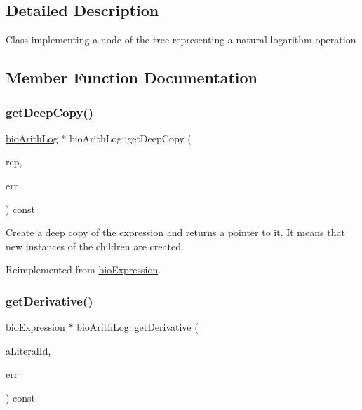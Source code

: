 \subsection{Detailed Description}
Class implementing a node of the tree representing a natural logarithm operation 

\subsection{Member Function Documentation}
\mbox{\label{classbio_arith_log_a1717f06ff8d70f5285272ee66c669174}} 
\subsubsection{\texorpdfstring{get\+Deep\+Copy()}{getDeepCopy()}}
{\footnotesize\ttfamily \hyperlink{classbio_arith_log}{bio\+Arith\+Log} $\ast$ bio\+Arith\+Log\+::get\+Deep\+Copy (\begin{DoxyParamCaption}\item[{\hyperlink{classbio_expression_repository}{bio\+Expression\+Repository} $\ast$}]{rep,  }\item[{pat\+Error $\ast$\&}]{err }\end{DoxyParamCaption}) const\hspace{0.3cm}{\ttfamily [virtual]}}

Create a deep copy of the expression and returns a pointer to it. It means that new instances of the children are created. 

Reimplemented from \hyperlink{classbio_expression_a4ee1b8add634078a02eaae26cd40dcc8}{bio\+Expression}.

\mbox{\label{classbio_arith_log_aeb045e82ab8f0c99919b83102d71c527}} 
\subsubsection{\texorpdfstring{get\+Derivative()}{getDerivative()}}
{\footnotesize\ttfamily \hyperlink{classbio_expression}{bio\+Expression} $\ast$ bio\+Arith\+Log\+::get\+Derivative (\begin{DoxyParamCaption}\item[{pat\+U\+Long}]{a\+Literal\+Id,  }\item[{pat\+Error $\ast$\&}]{err }\end{DoxyParamCaption}) const\hspace{0.3cm}{\ttfamily [virtual]}}


